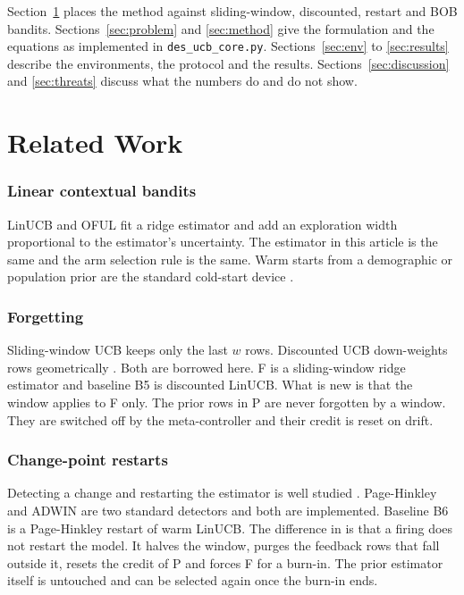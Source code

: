 Section~\ref{sec:related} places the method against sliding-window, discounted, restart and BOB bandits. Sections~\ref{sec:problem} and \ref{sec:method} give the formulation and the equations as implemented in \texttt{des\_ucb\_core.py}. Sections~\ref{sec:env} to \ref{sec:results} describe the environments, the protocol and the results. Sections~\ref{sec:discussion} and \ref{sec:threats} discuss what the numbers do and do not show.

\section{Related Work}
\label{sec:related}

\subsubsection*{Linear contextual bandits}
LinUCB \cite{li2010} and OFUL \cite{abbasi2011} fit a ridge estimator and add an exploration width proportional to the estimator's uncertainty. The estimator in this article is the same and the arm selection rule is the same. Warm starts from a demographic or population prior are the standard cold-start device \cite{li2010,shivaswamy2012}.

\subsubsection*{Forgetting}
Sliding-window UCB \cite{garivier2011} keeps only the last $w$ rows. Discounted UCB down-weights rows geometrically \cite{garivier2011,russac2019}. Both are borrowed here. F is a sliding-window ridge estimator and baseline B5 is discounted LinUCB. What is new is that the window applies to F only. The prior rows in P are never forgotten by a window. They are switched off by the meta-controller and their credit is reset on drift.

\subsubsection*{Change-point restarts}
Detecting a change and restarting the estimator is well studied \cite{liu2018,cao2019,besson2022}. Page-Hinkley \cite{page1954} and ADWIN \cite{bifet2007} are two standard detectors and both are implemented. Baseline B6 is a Page-Hinkley restart of warm LinUCB. The difference in \des{} is that a firing does not restart the model. It halves the window, purges the feedback rows that fall outside it, resets the credit of P and forces F for a burn-in. The prior estimator itself is untouched and can be selected again once the burn-in ends.

